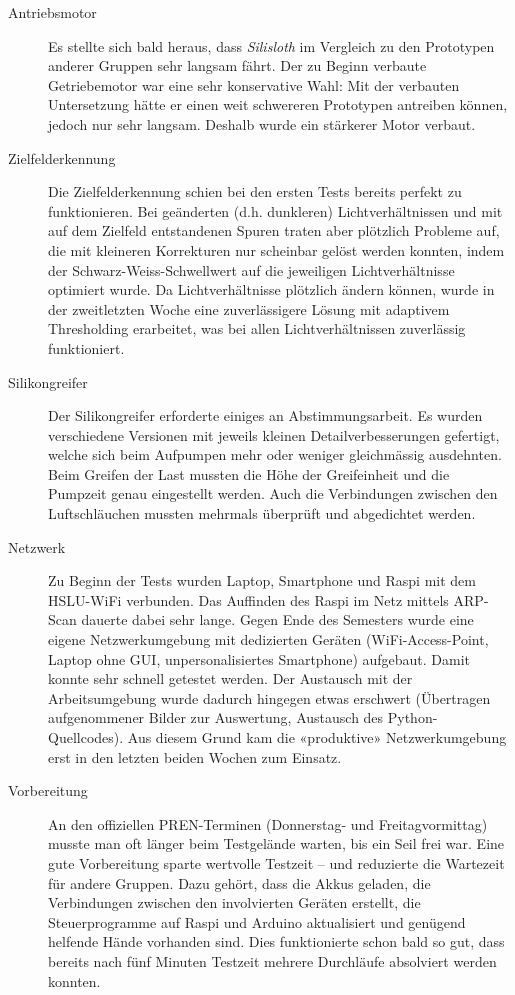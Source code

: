 \begin{description}
    \item[Antriebsmotor] Es stellte sich bald heraus, dass \textit{Silisloth} im Vergleich zu den Prototypen anderer Gruppen sehr langsam fährt. Der zu Beginn verbaute Getriebemotor war eine sehr konservative Wahl: Mit der verbauten Untersetzung hätte er einen weit schwereren Prototypen antreiben können, jedoch nur sehr langsam. Deshalb wurde ein stärkerer Motor verbaut.
    \item[Zielfelderkennung] Die Zielfelderkennung schien bei den ersten Tests bereits perfekt zu funktionieren. Bei geänderten (d.h. dunkleren) Lichtverhältnissen und mit auf dem Zielfeld entstandenen Spuren traten aber plötzlich Probleme auf, die mit kleineren Korrekturen nur scheinbar gelöst werden konnten, indem der Schwarz-Weiss-Schwellwert auf die jeweiligen Lichtverhältnisse optimiert wurde. Da Lichtverhältnisse plötzlich ändern können, wurde in der zweitletzten Woche eine zuverlässigere Lösung mit adaptivem Thresholding erarbeitet, was bei allen Lichtverhältnissen zuverlässig funktioniert.
    \item[Silikongreifer] Der Silikongreifer erforderte einiges an Abstimmungsarbeit. Es wurden verschiedene Versionen mit jeweils kleinen Detailverbesserungen gefertigt, welche sich beim Aufpumpen mehr oder weniger gleichmässig ausdehnten. Beim Greifen der Last mussten die Höhe der Greifeinheit und die Pumpzeit genau eingestellt werden. Auch die Verbindungen zwischen den Luftschläuchen mussten mehrmals überprüft und abgedichtet werden.
    \item[Netzwerk] Zu Beginn der Tests wurden Laptop, Smartphone und Raspi mit dem HSLU-WiFi verbunden. Das Auffinden des Raspi im Netz mittels ARP-Scan dauerte dabei sehr lange. Gegen Ende des Semesters wurde eine eigene Netzwerkumgebung mit dedizierten Geräten (WiFi-Access-Point, Laptop ohne GUI, unpersonalisiertes Smartphone) aufgebaut. Damit konnte sehr schnell getestet werden. Der Austausch mit der Arbeitsumgebung wurde dadurch hingegen etwas erschwert (Übertragen aufgenommener Bilder zur Auswertung, Austausch des Python-Quellcodes). Aus diesem Grund kam die «produktive» Netzwerkumgebung erst in den letzten beiden Wochen zum Einsatz.
    \item[Vorbereitung] An den offiziellen PREN-Terminen (Donnerstag- und Freitagvormittag) musste man oft länger beim Testgelände warten, bis ein Seil frei war. Eine gute Vorbereitung sparte wertvolle Testzeit -- und reduzierte die Wartezeit für andere Gruppen. Dazu gehört, dass die Akkus geladen, die Verbindungen zwischen den involvierten Geräten erstellt, die Steuerprogramme auf Raspi und Arduino aktualisiert und genügend helfende Hände vorhanden sind. Dies funktionierte schon bald so gut, dass bereits nach fünf Minuten Testzeit mehrere Durchläufe absolviert werden konnten.

\end{description}
